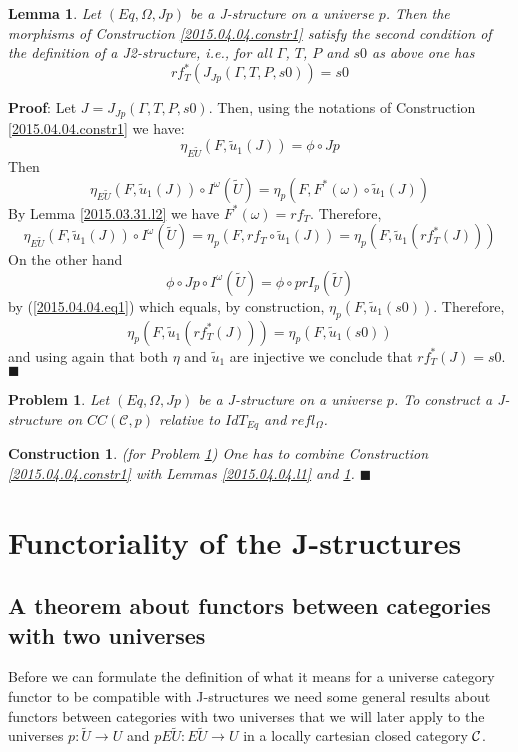 \documentclass[12pt]{article}
\numberwithin{equation}{section}
\newenvironment{myproof}{{\bf Proof}:}{$\blacksquare$ \vskip 5mm }
\newtheorem{lemma}[proposition]{Lemma}
\newtheorem{problem}[proposition]{Problem}
\newtheorem{construction0}[proposition]{Construction}
\newenvironment{construction}[1]{\begin{construction0}(for Problem \ref{#1})}{$\blacksquare$ \end{construction0}}
\newcommand{\llabel}[1]{\label{#1}}
\newcommand{\sr}{\rightarrow}
\newcommand{\wt}{\widetilde}
\newcommand{\toCC}{CC} %
\begin{document}
%
\begin{lemma}
\llabel{2015.04.04.l5} Let $(Eq,\Omega,Jp)$ be a J-structure on a universe
$p$. Then the morphisms of Construction \ref{2015.04.04.constr1} satisfy the
second condition of the definition of a J2-structure, i.e., for all $\Gamma$,
$T$, $P$ and $s0$ as above one has
%
$$rf_T^*(J_{Jp}(\Gamma,T,P,s0))=s0$$
%
\end{lemma}
%
\begin{myproof}
Let $J=J_{Jp}(\Gamma,T,P,s0)$. Then, using the notations of Construction
\ref{2015.04.04.constr1} we have:
%
$$\eta_{E\wt{U}}(F,\wt{u}_1(J))=\phi\circ Jp$$
%
Then
%
$$\eta_{E\wt{U}}(F,\wt{u}_1(J))\circ
I^{\omega}(\wt{U})=\eta_p(F,F^*(\omega)\circ \wt{u}_1(J))$$
%
By Lemma \ref{2015.03.31.l2} we have $F^*(\omega)=rf_T$. Therefore,
%
$$\eta_{E\wt{U}}(F,\wt{u}_1(J))\circ I^{\omega}(\wt{U})=\eta_p(F,rf_T\circ
\wt{u}_1(J))=\eta_p(F,\wt{u}_1(rf_T^*(J)))$$
%
On the other hand
%
$$\phi\circ Jp\circ I^{\omega}(\wt{U})=\phi\circ prI_p(\wt{U})$$
%
by (\ref{2015.04.04.eq1}) which equals, by construction,
$\eta_p(F,\wt{u}_1(s0))$. Therefore,
%
$$\eta_p(F,\wt{u}_1(rf_T^*(J)))=\eta_p(F,\wt{u}_1(s0))$$
%
and using again that both $\eta$ and $\wt{u}_1$ are injective we conclude that
$rf_T^*(J)=s0$.
\end{myproof}
%
\begin{problem}
\llabel{2015.04.04.prob2} Let $(Eq,\Omega,Jp)$ be a J-structure on a universe
$p$. To construct a J-structure on $\toCC({\mathcal C},p)$ relative to $IdT_{Eq}$
and $refl_{\Omega}$.
\end{problem} 
%
\begin{construction}{2015.04.04.prob2}\rm
\llabel{2015.04.04.constr2} One has to combine Construction
\ref{2015.04.04.constr1} with Lemmas \ref{2015.04.04.l1} and
\ref{2015.04.04.l5}.
\end{construction}
%





\section{Functoriality of the J-structures}




\subsection{A theorem about functors between categories with two universes}
\llabel{twouniv}
%
Before we can formulate the definition of what it means for a universe category
functor to be compatible with J-structures we need some general results about
functors between categories with two universes that we will later apply to the
universes $p:\wt{U}\sr U$ and $pE\wt{U}:E\wt{U}\sr U$ in a locally cartesian
closed category $\cal C$.
\end{document}
